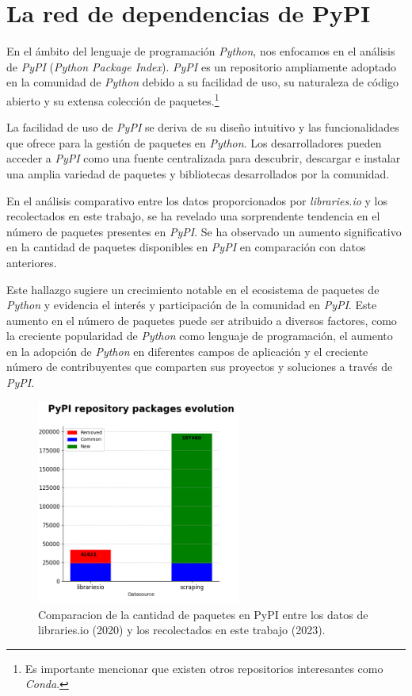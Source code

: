 \newpage

\section{La red de dependencias de PyPI}

En el ámbito del lenguaje de programación \textit{Python}, nos enfocamos en el análisis de \textit{PyPI}
(\textit{Python Package Index}). \textit{PyPI} es un repositorio ampliamente adoptado en la comunidad de
\textit{Python} debido a su facilidad de uso, su naturaleza de código abierto y su extensa colección de
paquetes.\footnote{Es importante mencionar que existen otros repositorios interesantes como \textit{Conda}.}

La facilidad de uso de \textit{PyPI} se deriva de su diseño intuitivo y las funcionalidades que ofrece
para la gestión de paquetes en \textit{Python}. Los desarrolladores pueden acceder a \textit{PyPI} como
una fuente centralizada para descubrir, descargar e instalar una amplia variedad de paquetes y bibliotecas
desarrollados por la comunidad.

En el análisis comparativo entre los datos proporcionados por \textit{libraries.io} y los recolectados en
este trabajo, se ha revelado una sorprendente tendencia en el número de paquetes presentes en \textit{PyPI}.
Se ha observado un aumento significativo en la cantidad de paquetes disponibles en \textit{PyPI} en
comparación con datos anteriores.

Este hallazgo sugiere un crecimiento notable en el ecosistema de paquetes de \textit{Python} y evidencia
el interés y participación de la comunidad en \textit{PyPI}. Este aumento en el número de paquetes puede
ser atribuido a diversos factores, como la creciente popularidad de \textit{Python} como lenguaje de
programación, el aumento en la adopción de \textit{Python} en diferentes campos de aplicación y el
creciente número de contribuyentes que comparten sus proyectos y soluciones a través de \textit{PyPI}.


\begin{figure}[h!]
    \begin{center}
        \includegraphics[width=0.6\textwidth]{img/pypi/bar_common_packages.png}
        \caption{Comparacion de la cantidad de paquetes en PyPI entre los datos de libraries.io (2020) y los recolectados en este trabajo (2023).}
        \label{fig:pipy_common_packages_bar}
    \end{center}
\end{figure}

